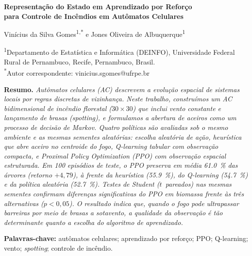 \documentclass[11pt,a4paper]{article}
\begin{document}
\raggedbottom
{}

\begin{flushleft}
{\LARGE\bfseries Representação do Estado em Aprendizado por Reforço\\
para Controle de Incêndios em Autômatos Celulares}

\vspace{1.2em}
{\large
Vinícius da Silva Gomes\textsuperscript{1,*} e
Jones Oliveira de Albuquerque\textsuperscript{1}
}

\vspace{0.8em}
{\small
\textsuperscript{1}Departamento de Estatística e Informática (DEINFO), Universidade Federal Rural de Pernambuco, Recife, Pernambuco, Brasil.\\[0.35em]
\textsuperscript{*}Autor correspondente: vinicius.sgomes@ufrpe.br
}
\end{flushleft}

\vspace{1.2em}

\noindent\textbf{Resumo.}
\textit{Autômatos celulares (AC) descrevem a evolução espacial de sistemas
locais por regras discretas de vizinhança. Neste trabalho, construímos um AC
bidimensional de incêndio florestal ($30\times 30$) que inclui vento constante
e lançamento de brasas (\emph{spotting}), e formulamos a abertura de aceiros
como um processo de decisão de Markov. Quatro políticas são avaliadas sob o
mesmo ambiente e as mesmas sementes aleatórias: escolha aleatória de ação,
heurística que abre aceiro no centroide do fogo, \emph{Q-learning} tabular com
observação compacta, e Proximal Policy Optimization (PPO) com observação
espacial estruturada. Em 100 episódios de teste, o PPO preserva em média
\SI{61,0}{\percent} das árvores (retorno $+4{,}79$), à frente da heurística
(\SI{55,9}{\percent}), do \emph{Q-learning} (\SI{54,7}{\percent}) e da
política aleatória (\SI{52,7}{\percent}).
Testes de Student ($t$~pareados) nas mesmas sementes confirmam diferenças
significativas do PPO em biomassa frente às três alternativas ($p<0{,}05$).
O resultado indica que, quando o fogo
pode ultrapassar barreiras por meio de brasas a sotavento, a qualidade da observação é tão
determinante quanto a escolha do algoritmo de aprendizado.}

\medskip
\noindent\textbf{Palavras-chave:}
autômatos celulares; aprendizado por reforço; PPO; Q-learning; vento;
\emph{spotting}; controle de incêndio.
\end{document}
